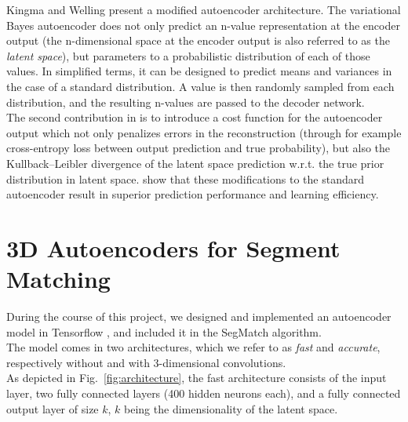 Kingma and Welling \cite{variational-autoencoder} present a modified autoencoder architecture. The variational Bayes autoencoder does not only predict an n-value representation at the encoder output (the n-dimensional space at the encoder output is also referred to as the \textit{latent space}), but parameters to a probabilistic distribution of each of those values. In simplified terms, it can be designed to predict means and variances in the case of a standard distribution. A value is then randomly sampled from each distribution, and the resulting n-values are passed to the decoder network.\\

The second contribution in \citet{variational-autoencoder} is to introduce a cost function for the autoencoder output which not only penalizes errors in the reconstruction (through for example cross-entropy loss between output prediction and true probability), but also the Kullback–Leibler divergence of the latent space prediction w.r.t. the true prior distribution in latent space. \citet{variational-autoencoder} show that these modifications to the standard autoencoder result in superior prediction performance and learning efficiency.

\section{3D Autoencoders for Segment Matching}
\label{sec:ae-implementation}

During the course of this project, we designed and implemented an autoencoder model in Tensorflow \cite{tensorflow}, and included it in the SegMatch algorithm.\\

The model comes in two architectures, which we refer to as \textit{fast} and \textit{accurate}, respectively without and with 3-dimensional convolutions.\\

As depicted in Fig.~\ref{fig:architecture}, the fast architecture consists of the input layer, two fully connected layers (400 hidden neurons each), and a fully connected output layer of size $k$, $k$ being the dimensionality of the latent space.

